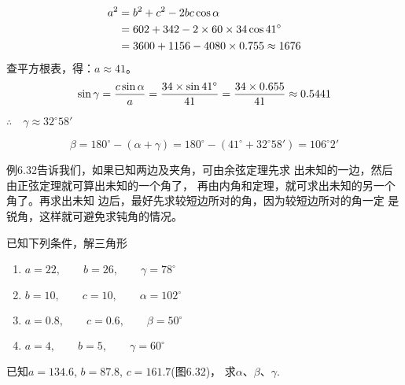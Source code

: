 \begin{solution}
\[\begin{split}
    a^2&=b^2+c^2-2bc\cos\alpha\\
&=602+342-2\times60\times34\cos41^{\circ}\\
&=3600+1156-4080\times0.755\approx 1676
\end{split}\]
查平方根表，得：$a\approx 41$。
\[\sin\gamma=\dfrac{c\sin\alpha}{a}=\dfrac{34\times\sin41^{\circ}}{41}=\dfrac{34\times 0.655}{41}\approx 0.5441\]

$\therefore\quad \gamma\approx 32^{\circ}58'$

\[\beta=180^{\circ}-(\alpha+\gamma)
=180^{\circ}-(41^{\circ}+32^{\circ}58')
=106^{\circ}2'\]    
\end{solution}


例6.32告诉我们，如果已知两边及夹角，可由余弦定理先求
出未知的一边，然后由正弦定理就可算出未知的一个角了，
再由内角和定理，就可求出未知的另一个角了。再求出未知
边后，最好先求较短边所对的角，因为较短边所对的角一定
是锐角，这样就可避免求钝角的情况。

\begin{ex}
    已知下列条件，解三角形
\begin{enumerate}
\item  $a=22,\qquad b=26,\qquad \gamma=78^{\circ}$
\item  $b=10,\qquad c=10,\qquad \alpha=102^{\circ}$
\item  $a=0.8,\qquad c=0.6,\qquad \beta=50^{\circ}$
\item  $a=4,\qquad b=5,\qquad \gamma=60^{\circ}$
\end{enumerate}
\end{ex}

\begin{example}
    已知$a=134.6$, $b=87.8$, $c=161.7$(图6.32)，
    求$\alpha$、$\beta$、$\gamma$.
\end{example}

\begin{figure}[htp]
    \centering
{}
    \caption{}
\end{figure}

